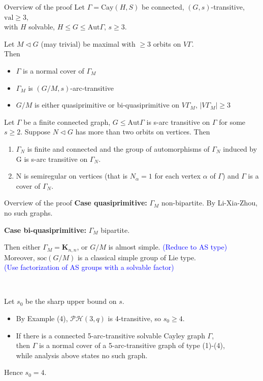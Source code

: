 \documentclass{beamer}
\def\Aut{\mathrm{Aut}}
\def\Cay{\mathrm{Cay}}
\def\val{\mathrm{val}}
\def\PH{\mathcal{PH}}
\def\soc{\mathrm{soc}}
\begin{document}
\begin{frame}{Overview of the proof}
	Let $\Gamma=\Cay(H,S)$ be connected, $(G,s)$-transitive, $\val\geq 3$,\\ with $H$ solvable, $H\leq G\leq \Aut\Gamma$, $s\geq 3$.
	
	Let $M\triangleleft G$ (may trivial) be maximal with $\geq 3$ orbits on $V\Gamma$.\\Then
	\begin{itemize}
		\item $\Gamma$ is a normal cover of $\Gamma_M$
		\item $\Gamma_M$ is $(G/M,s)$-arc-transitive
		\item $G/M$ is either quasiprimitive or bi-quasiprimitive on $V\Gamma_M$, $|V\Gamma_M|\geq 3$
	\end{itemize}

\begin{theorem}[Praeger,1993]
Let $\Gamma$ be a finite connected graph, $G\leq \Aut\Gamma$ is s-arc transitive on $\Gamma$ for some $s\geq 2$. Suppose $N\triangleleft G$ has more than two orbits on vertices. Then\begin{enumerate}
	\item $\Gamma_N$ is finite and connected and the group of automorphisms of $\Gamma_N$ induced by G is s-arc transitive on $\Gamma_N$.
	\item N is semiregular on vertices (that is $N_\alpha= 1$ for each vertex $\alpha$ of $\Gamma$) and $\Gamma$ is a cover of $\Gamma_N$. 
\end{enumerate}  
\end{theorem}

\end{frame}

\begin{frame}{Overview of the proof}
\textbf{Case quasiprimitive:} 
$\Gamma_M$ non-bipartite. By Li-Xia-Zhou, no such graphs.

\textbf{Case bi-quasiprimitive:} $\Gamma_M$ bipartite.

Then either $\Gamma_M=\mathbf{K}_{n,n}$, or $G/M$ is almost simple. \textcolor{blue}{(Reduce to AS type)}\\Moreover, $\soc(G/M)$ is a classical simple group of Lie type. \\\textcolor{blue}{(Use factorization of AS groups with a solvable factor)}

\ 

Let $s_0$ be the sharp upper bound on $s$.
\begin{itemize}
	\item By Example (4), $\PH(3,q)$ is 4-transitive, so $s_0\geq 4$.
	\item If there is a connected 5-arc-transitive solvable Cayley graph $\Gamma$, \\ then $\Gamma$ is a normal cover of a 5-arc-transitive graph of type (1)-(4),\\ while analysis above states no such graph. 
\end{itemize}
Hence $s_0=4$.
\end{frame}
\end{document}
